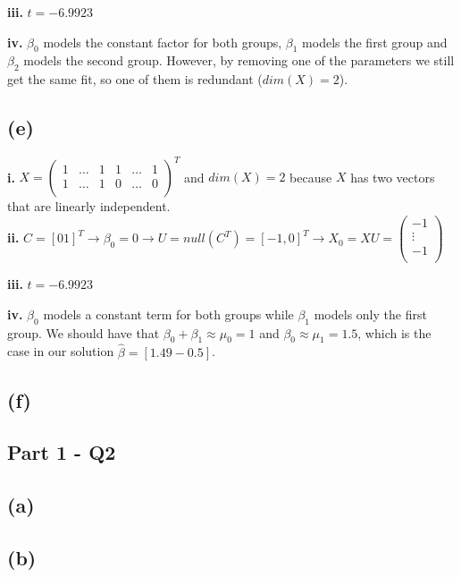 \documentclass[12pt,a4paper,oneside]{report}
\begin{document}
\textbf{iii. } $t = -6.9923$

\textbf{iv. } $\beta_0$ models the constant factor for both groups, $\beta_1$ models the first group and $\beta_2$ models the second group. However, by removing one of the parameters we still get the same fit, so one of them is redundant ($dim(X) = 2$).

\subsection*{(e)}

\textbf{i. } $X = \begin{pmatrix}
1 & \dots & 1 & 1 & \dots & 1\\
1 & \dots & 1 & 0 & \dots & 0\\
\end{pmatrix}^T$ and $dim(X) = 2$ because $X$ has two vectors that are linearly independent.\\

\textbf{ii. } $C = [0 1]^T \to \beta_0 = 0 \to U = null(C^T) = [-1, 0]^T \to X_0 = X U = \begin{pmatrix}
-1\\
\vdots\\
-1\\
\end{pmatrix}$

\textbf{iii. } $t = -6.9923$

\textbf{iv. } $\beta_0$ models a constant term for both groups while $\beta_1$ models only the first group. We should have that $\beta_0 + \beta_1 \approx \mu_0 = 1$ and $\beta_0 \approx \mu_1 = 1.5$, which is the case in our solution $\hat{\beta} = [1.49 -0.5]$.

\subsection*{(f)}



\subsection*{Part 1 - Q2}

\subsection*{(a)}

\subsection*{(b)}
\end{document}

